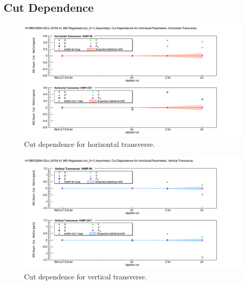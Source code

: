 \subsection{Cut Dependence}
\label{Cut Dependence 2}

\begin{figure}[!h]
	\begin{center}
	\includegraphics[width=15.0cm]{figures/cutDependence_LH2_h_individual}
	\end{center}
	\caption
	{Cut dependence for horizontal transverse.}
	\label{fig:cutDependence_LH2_h_individual}
\end{figure}

\begin{figure}[!h]
	\begin{center}
	\includegraphics[width=15.0cm]{figures/cutDependence_LH2_v_individual}
	\end{center}
	\caption
	{Cut dependence for vertical transverse.}
	\label{fig:cutDependence_LH2_v_individual}
\end{figure}



